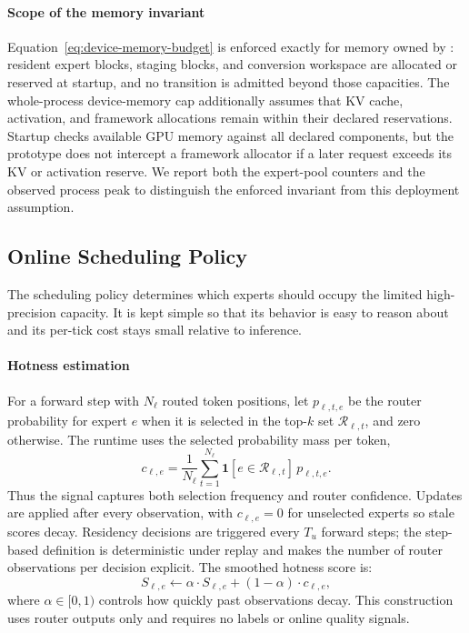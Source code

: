 \paragraph{Scope of the memory invariant}
Equation~\eqref{eq:device-memory-budget} is enforced exactly for memory owned by \systemname: resident expert blocks, staging blocks, and conversion workspace are allocated or reserved at startup, and no transition is admitted beyond those capacities. The whole-process device-memory cap additionally assumes that KV cache, activation, and framework allocations remain within their declared reservations. Startup checks available GPU memory against all declared components, but the prototype does not intercept a framework allocator if a later request exceeds its KV or activation reserve. We report both the expert-pool counters and the observed process peak to distinguish the enforced invariant from this deployment assumption.

\subsection{Online Scheduling Policy}
\label{sec:policy}

The scheduling policy determines which experts should occupy the limited high-precision capacity. It is kept simple so that its behavior is easy to reason about and its per-tick cost stays small relative to inference.

\paragraph{Hotness estimation}
For a forward step with $N_\ell$ routed token positions, let $p_{\ell,t,e}$ be the router probability for expert $e$ when it is selected in the top-$k$ set $\mathcal{R}_{\ell,t}$, and zero otherwise. The runtime uses the selected probability mass per token,
\[
c_{\ell,e}=\frac{1}{N_\ell}\sum_{t=1}^{N_\ell}
\mathbf{1}[e\in\mathcal{R}_{\ell,t}]\,p_{\ell,t,e}.
\]
Thus the signal captures both selection frequency and router confidence. Updates are applied after every observation, with $c_{\ell,e}=0$ for unselected experts so stale scores decay. Residency decisions are triggered every $T_u$ forward steps; the step-based definition is deterministic under replay and makes the number of router observations per decision explicit. The smoothed hotness score is:
\[
S_{\ell,e} \leftarrow \alpha \cdot S_{\ell,e} + (1-\alpha)\cdot c_{\ell,e},
\]
where $\alpha \in [0,1)$ controls how quickly past observations decay. This construction uses router outputs only and requires no labels or online quality signals.

